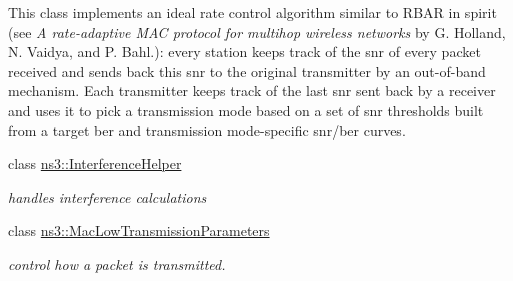 \begin{DoxyCompactItemize}
\begin{DoxyCompactList}
This class implements an \textquotesingle{}ideal\textquotesingle{} rate control algorithm similar to R\+B\+AR in spirit (see {\itshape A rate-\/adaptive M\+AC protocol for multihop wireless networks} by G. Holland, N. Vaidya, and P. Bahl.)\+: every station keeps track of the snr of every packet received and sends back this snr to the original transmitter by an out-\/of-\/band mechanism. Each transmitter keeps track of the last snr sent back by a receiver and uses it to pick a transmission mode based on a set of snr thresholds built from a target ber and transmission mode-\/specific snr/ber curves. \end{DoxyCompactList}\item 
class \hyperlink{classns3_1_1InterferenceHelper}{ns3\+::\+Interference\+Helper}
\begin{DoxyCompactList}\small\item\em handles interference calculations \end{DoxyCompactList}\item 
class \hyperlink{classns3_1_1MacLowTransmissionParameters}{ns3\+::\+Mac\+Low\+Transmission\+Parameters}
\begin{DoxyCompactList}\small\item\em control how a packet is transmitted.


\end{DoxyCompactList}
\end{DoxyCompactItemize}
